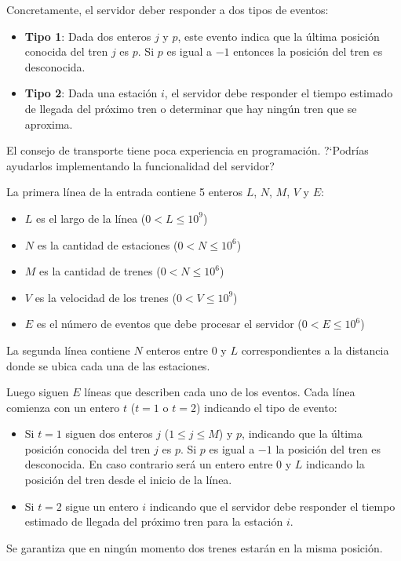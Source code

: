 \documentclass{oci}
\begin{document}
\begin{problemDescription}
  Concretamente, el servidor deber responder a dos tipos
  de eventos:
  \begin{itemize}
    \item \textbf{Tipo 1}: Dada dos enteros $j$ y $p$, este evento
    indica que la última posición conocida del tren $j$ es $p$.
    Si $p$ es igual a $-1$ entonces la posición del tren es desconocida.
    \item \textbf{Tipo 2}: Dada una estación $i$, el servidor debe
    responder el tiempo estimado de llegada del próximo tren o determinar
    que hay ningún tren que se aproxima.
  \end{itemize}
  El consejo de transporte tiene poca experiencia en programación.
  ?`Podrías ayudarlos implementando la funcionalidad del servidor?
\end{problemDescription}

\begin{inputDescription}
  La primera línea de la entrada contiene 5 enteros $L$, $N$, $M$, $V$ y $E$:
  \begin{itemize}
    \item $L$ es el largo de la línea ($0 < L \leq 10^9$)
    \item $N$ es la cantidad de estaciones ($0 < N \leq 10^6$)
    \item $M$ es la cantidad de trenes ($0 < N \leq 10^6$)
    \item $V$ es la velocidad de los trenes ($0 < V \leq 10^9$)
    \item $E$ es el número de eventos que debe procesar el servidor ($0 < E \leq 10^6$)
  \end{itemize}
  La segunda línea contiene $N$ enteros entre 0 y $L$ correspondientes a la distancia
  donde se ubica cada una de las estaciones.

  Luego siguen $E$ líneas que describen cada uno de los eventos.
  Cada línea comienza con un entero $t$ ($t=1$ o $t=2$) indicando el tipo de evento:
  \begin{itemize}
  \item Si $t=1$ siguen dos enteros $j$ ($1\leq j \leq M$) y $p$, indicando
  que la última posición conocida del tren $j$ es $p$.
  Si $p$ es igual a $-1$ la posición del tren es desconocida.
  En caso contrario será un entero entre 0 y $L$ indicando la posición del tren
  desde el inicio de la línea.
  \item Si $t=2$ sigue un entero $i$ indicando que el servidor debe responder el tiempo
  estimado de llegada del próximo tren para la estación $i$.
  \end{itemize}

  Se garantiza que en ningún momento dos trenes estarán en la misma posición.
\end{inputDescription}
\end{document}
